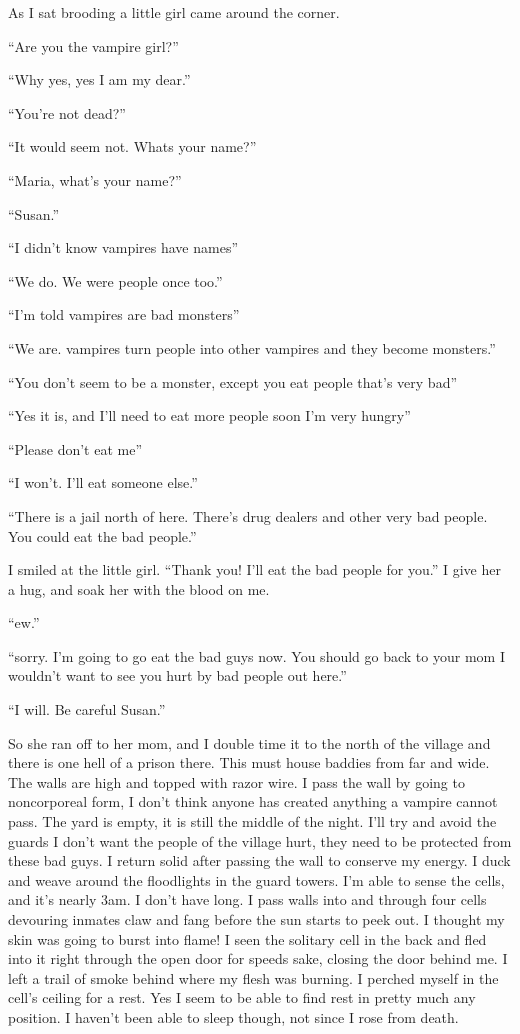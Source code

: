 As I sat brooding a little girl came around the corner.

``Are you the vampire girl?''

``Why yes, yes I am my dear.''

``You're not dead?''

``It would seem not. Whats your name?''

``Maria, what's your name?''

``Susan.''

``I didn't know vampires have names''

``We do. We were people once too.''

``I'm told vampires are bad monsters''

``We are. vampires turn people into other vampires and they become monsters.''

``You don't seem to be a monster, except you eat people that's very bad''

``Yes it is, and I'll need to eat more people soon I'm very hungry''

``Please don't eat me''

``I won't. I'll eat someone else.''

``There is a jail north of here. There's drug dealers and other very bad people. You could eat the bad people.''

I smiled at the little girl. ``Thank you! I'll eat the bad people for you.'' I give her a hug, and soak her with the blood on me.

``ew.''

``sorry. I'm going to go eat the bad guys now. You should go back to your mom I wouldn't want to see you hurt by bad people out here.''

``I will. Be careful Susan.''

So she ran off to her mom, and I double time it to the north of the village and there is one hell of a prison there. This must house baddies from far and wide. The walls are high and topped with razor wire. I pass the wall by going to noncorporeal form, I don't think anyone has created anything a vampire cannot pass. The yard is empty, it is still the middle of the night. I'll try and avoid the guards I don't want the people of the village hurt, they need to be protected from these bad guys. I return solid after passing the wall to conserve my energy. I duck and weave around the floodlights in the guard towers. I'm able to sense the cells, and it's nearly 3am. I don't have long. I pass walls into and through four cells devouring inmates claw and fang before the sun starts to peek out. I thought my skin was going to burst into flame! I seen the solitary cell in the back and fled into it right through the open door for speeds sake, closing the door behind me. I left a trail of smoke behind where my flesh was burning. I perched myself in the cell's ceiling for a rest. Yes I seem to be able to find rest in pretty much any position. I haven't been able to sleep though, not since I rose from death.

